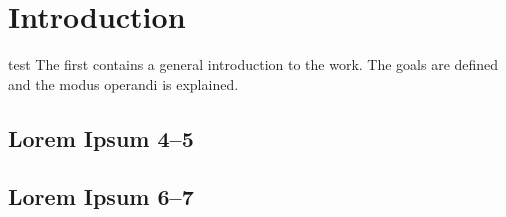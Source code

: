 \chapter{Introduction}
\label{cha:intro}
test
\label{remove}
The first contains a general introduction to the work. The goals are
defined and the modus operandi is explained.

\section{Lorem Ipsum 4--5}
\lipsum[4-5]

\section{Lorem Ipsum 6--7}
\lipsum[6-7]

